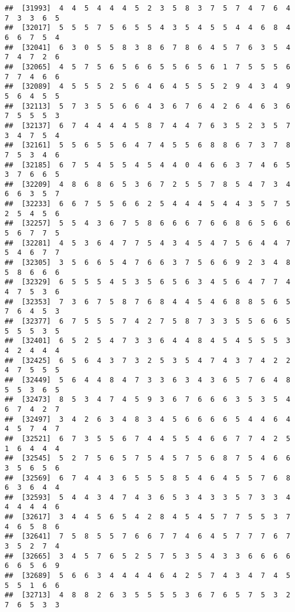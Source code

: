 \documentclass[
]{book}
\begin{document}
\begin{verbatim}
##  [31993]  4  4  5  4  4  4  5  2  3  5  8  3  7  5  7  4  7  6  4  7  3  3  6  5
##  [32017]  5  5  5  7  5  6  5  5  4  3  5  4  5  5  4  4  6  8  4  6  6  7  5  4
##  [32041]  6  3  0  5  5  8  3  8  6  7  8  6  4  5  7  6  3  5  4  7  4  7  2  6
##  [32065]  4  5  7  5  6  5  6  6  5  5  6  5  6  1  7  5  5  5  6  7  7  4  6  6
##  [32089]  4  5  5  5  2  5  6  4  6  4  5  5  5  2  9  4  3  4  9  5  6  4  5  5
##  [32113]  5  7  3  5  5  6  6  4  3  6  7  6  4  2  6  4  6  3  6  7  5  5  5  3
##  [32137]  6  7  4  4  4  4  5  8  7  4  4  7  6  3  5  2  3  5  7  3  4  7  5  4
##  [32161]  5  5  6  5  5  6  4  7  4  5  5  6  8  8  6  7  3  7  8  7  5  3  4  6
##  [32185]  6  7  5  4  5  5  4  5  4  4  0  4  6  6  3  7  4  6  5  3  7  6  6  5
##  [32209]  4  8  6  8  6  5  3  6  7  2  5  5  7  8  5  4  7  3  4  6  6  3  5  7
##  [32233]  6  6  7  5  5  6  6  2  5  4  4  4  5  4  4  3  5  7  5  2  5  4  5  6
##  [32257]  5  5  4  3  6  7  5  8  6  6  6  7  6  6  8  6  5  6  6  5  6  7  7  5
##  [32281]  4  5  3  6  4  7  7  5  4  3  4  5  4  7  5  6  4  4  7  5  4  6  7  7
##  [32305]  3  5  6  6  5  4  7  6  6  3  7  5  6  6  9  2  3  4  8  5  8  6  6  6
##  [32329]  6  5  5  5  4  5  3  5  6  5  6  3  4  5  6  4  7  7  4  4  7  5  3  6
##  [32353]  7  3  6  7  5  8  7  6  8  4  4  5  4  6  8  8  5  6  5  7  6  4  5  3
##  [32377]  6  7  5  5  5  7  4  2  7  5  8  7  3  3  5  5  6  6  5  5  5  5  3  5
##  [32401]  6  5  2  5  4  7  3  3  6  4  4  8  4  5  4  5  5  5  3  4  2  4  4  4
##  [32425]  6  5  6  4  3  7  3  2  5  3  5  4  7  4  3  7  4  2  2  4  7  5  5  5
##  [32449]  5  6  4  4  8  4  7  3  3  6  3  4  3  6  5  7  6  4  8  5  5  3  6  5
##  [32473]  8  5  3  4  7  4  5  9  3  6  7  6  6  6  3  5  3  5  4  6  7  4  2  7
##  [32497]  3  4  2  6  3  4  8  3  4  5  6  6  6  6  5  4  4  6  4  4  5  7  4  7
##  [32521]  6  7  3  5  5  6  7  4  4  5  5  4  6  6  7  7  4  2  5  1  6  4  4  4
##  [32545]  5  2  7  5  6  5  7  5  4  5  7  5  6  8  7  5  4  6  6  3  5  6  5  6
##  [32569]  6  7  4  4  3  6  5  5  5  8  5  4  6  4  5  5  7  6  8  6  3  6  4  4
##  [32593]  5  4  4  3  4  7  4  3  6  5  3  4  3  3  5  7  3  3  4  4  4  4  4  6
##  [32617]  3  4  4  5  6  5  4  2  8  4  5  4  5  7  7  5  5  3  7  4  6  5  8  6
##  [32641]  7  5  8  5  5  7  6  6  7  7  4  6  4  5  7  7  7  6  7  3  5  2  7  4
##  [32665]  3  4  5  7  6  5  2  5  7  5  3  5  4  3  3  6  6  6  6  6  6  5  6  9
##  [32689]  5  6  6  3  4  4  4  4  6  4  2  5  7  4  3  4  7  4  5  5  5  1  6  6
##  [32713]  4  8  8  2  6  3  5  5  5  5  3  6  7  6  5  7  5  3  2  7  6  5  3  3

\end{verbatim}
\end{document}
